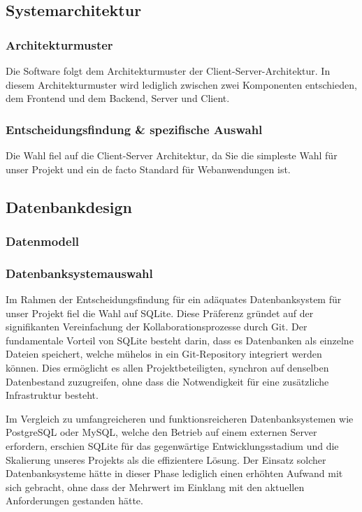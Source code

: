 \documentclass[../main.tex]{subfiles} %
\begin{document}
\subsection{Systemarchitektur} %

\subsubsection{Architekturmuster}

Die Software folgt dem Architekturmuster der Client-Server-Architektur. In diesem Architekturmuster wird lediglich zwischen zwei Komponenten entschieden, dem Frontend und dem Backend, Server und Client.


\subsubsection{Entscheidungsfindung \& spezifische Auswahl}

Die Wahl fiel auf die Client-Server Architektur, da Sie die simpleste Wahl für unser Projekt und ein de facto Standard für Webanwendungen ist.

\subsection{Datenbankdesign} %

\subsubsection{Datenmodell}

\subsubsection{Datenbanksystemauswahl}
Im Rahmen der Entscheidungsfindung für ein adäquates Datenbanksystem für unser Projekt fiel die Wahl auf SQLite.
Diese Präferenz gründet auf der signifikanten Vereinfachung der Kollaborationsprozesse durch Git. Der fundamentale Vorteil von SQLite besteht darin, dass es Datenbanken als einzelne Dateien speichert, welche mühelos in ein Git-Repository integriert werden können.
Dies ermöglicht es allen Projektbeteiligten, synchron auf denselben Datenbestand zuzugreifen, ohne dass die Notwendigkeit für eine zusätzliche Infrastruktur besteht.

Im Vergleich zu umfangreicheren und funktionsreicheren Datenbanksystemen wie PostgreSQL oder MySQL, welche den Betrieb auf einem externen Server erfordern, erschien SQLite für das gegenwärtige Entwicklungsstadium und die Skalierung unseres Projekts als die effizientere Lösung. Der Einsatz solcher Datenbanksysteme hätte in dieser Phase lediglich einen erhöhten Aufwand mit sich gebracht, ohne dass der Mehrwert im Einklang mit den aktuellen Anforderungen gestanden hätte.
\end{document}
